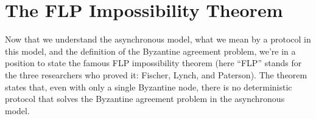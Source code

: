 \section{The FLP Impossibility Theorem}
Now that we understand the asynchronous model, what we mean by a protocol in this
model, and the definition of the Byzantine agreement problem, we’re in a position to state
the famous FLP impossibility theorem (here “FLP” stands for the three researchers who
proved it: Fischer, Lynch, and Paterson). The theorem states that, even with only a single
Byzantine node, there is no deterministic protocol that solves the Byzantine agreement
problem in the asynchronous model.\\


